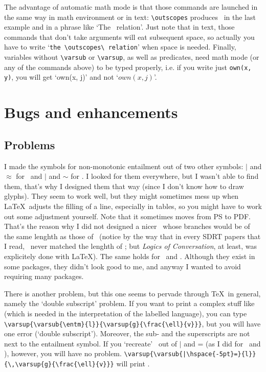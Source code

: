 \documentclass[a4paper]{article}
\begin{document}
The advantage of automatic math mode is that those commands are launched in the same way in math environment or in text: \verb+\outscopes+ produces \outscopes\ in the last example and in a phrase like `The \outscopes\ relation'. Just note that in text, those commands that don't take arguments will eat subsequent space, so actually you have to write `\verb+the \outscopes\ relation+' when space is needed. Finally, variables without \verb+\varsub+ or \verb+\varsup+, as well as predicates, need math mode (or any of the commands above) to be typed properly, i.e. if you write just \verb+own(x, y)+, you will get `own(x, j)' and not `$own(x, j)$'.

\section{Bugs and enhancements}

\subsection{Problems}
I made the symbols for non-monotonic entailment out of two other symbols: $|$ and $\approx$ for \nmentm\ and $|$ and $\sim$ for \nmentp. I looked for them everywhere, but I wasn't able to find them, that's why I designed them that way (since I don't know how to draw glyphs). They seem to work well, but they might sometimes mess up when \LaTeX\ adjusts the filling of a line, especially in tables, so you might have to work out some adjustment yourself. Note that it sometimes moves from PS to PDF. That's the reason why I did not designed a nicer \entp\ whose branches would be of the same lenghth as those of \entm\ (notice by the way that in every SDRT papers that I read, \entp\ never matched the lenghth of \entm; but \emph{Logics of Conversation}, at least, was explicitely done with \LaTeX). The same holds for \Lbracket\ and \Rbracket. Although they exist in some packages, they didn't look good to me, and anyway I wanted to avoid requiring many packages.

There is another problem, but this one seems to pervade through \TeX\ in general, namely the `double subscript' problem. If you want to print a complex stuff like \entm\  (which is needed in the interpretation of the labelled language), you can type \verb+\varsup{\varsub{\entm}{l}}{\varsup{g}{\frac{\ell}{v}}}+, but you will have one error (`double subscript'). Moreover, the sub- and the superscripts are not next to the entailment symbol. If you `recreate' \entm\ out of $|$ and = (as I did for \nmentp\ and \nmentm), however, you will have no problem. \verb+\varsup{\varsub{|\hspace{-5pt}=}{l}}{\,\varsup{g}{\frac{\ell}{v}}}+ will print .
\end{document}
